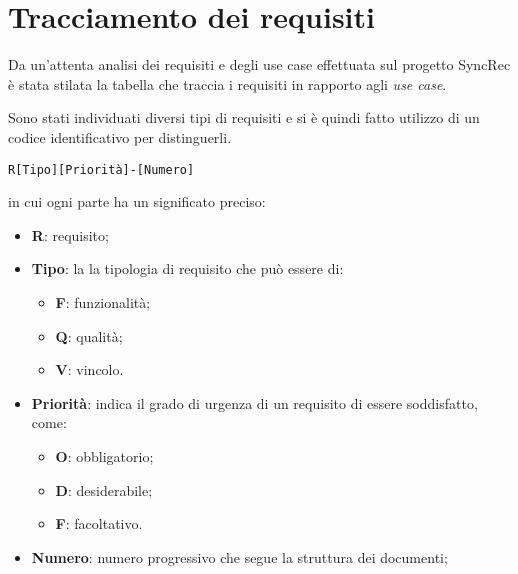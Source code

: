 \section{Tracciamento dei requisiti}

Da un'attenta analisi dei requisiti e degli use case effettuata sul progetto SyncRec è stata stilata la tabella che traccia i requisiti in rapporto agli \textit{use case}.

Sono stati individuati diversi tipi di requisiti e si è quindi fatto utilizzo di un codice identificativo per distinguerli.


\begin{center}
	\texttt{R[Tipo][Priorità]-[Numero]}
\end{center}
in cui ogni parte ha un significato preciso:
\begin{itemize}
	\item \textbf{R}: requisito;
	\item \textbf{Tipo}: la la tipologia di requisito che può essere di:
	\begin{itemize}
		\item \textbf{F}: funzionalità;
		\item \textbf{Q}: qualità;
		\item \textbf{V}: vincolo.
	\end{itemize}
	\item \textbf{Priorità}: indica il grado di urgenza di un requisito di essere soddisfatto, come:
	\begin{itemize}
		\item \textbf{O}: obbligatorio;
		\item \textbf{D}: desiderabile;
		\item \textbf{F}: facoltativo.
	\end{itemize}
	\item \textbf{Numero}: numero progressivo che segue la struttura dei documenti;
\end{itemize}

